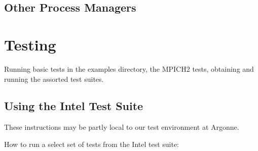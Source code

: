 \documentclass[dvipdfm,11pt]{article}
\begin{document}
\subsection{Other Process Managers}
\label{sec:other-pms}

\section{Testing}
\label{sec:testing}
Running basic tests in the examples directory, the MPICH2 tests,
obtaining and running the assorted test suites.  


\subsection{Using the Intel Test Suite}
\label{sec:intel}

These instructions may be partly local to our test environment at Argonne.

How to run a select set of tests from the Intel test suite:
\end{document}
